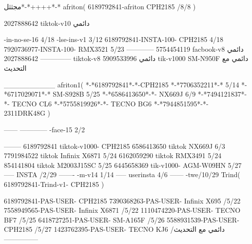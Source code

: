 مجثثل*-*++++*-*
afriton(
6189792841-afriton CPH2185  /8/8
)

2027888642 tiktok-v10
دائمي

-in-no-se-16 4/18
-lse-ins-v1 3/12
6189792841-INSTA-100- CPH2185 4/18
7920736977-INSTA-100- RMX3521 5/23
------------
5754454119 facbook-v8
دائمي
--------------
2027888642 tiktok-v8
دائمي
5909533996 tik-v1000  SM-N950F
دائمي مع التحديث

__________
afriton1(
*-*6189792841*-*-CPH2185
*-*7706352211*-* 5/14
*-*6717029071*-*  SM-S928B 5/25
*-*6586413650*-*- NX669J  6/9
*-*7494121837*-*-  TECNO CL6  \5
*-*5755819926*-*-   TECNO BG6  \5
*-*7944851595*-*-   2311DRK48G  \5\2
)


------
------------
-face-15 2/2

--------
6189792841 tiktok-v1000- CPH2185 
6586413650 tiktok NX669J  6/3
7791984522 tiktok Infinix X6871   5/24
6162059290 tiktok RMX3491   5/24
854141804 tiktok M2003J15SC   5/25
6445658369 tik-v1000- AGM-W09HN  5/27
-----
 INSTA /2/29
-------
-m-v14 1/14
-----
userinsta 4/6
------
-twe/10/29
Trind(
6189792841-Trind-v1- CPH2185 
)

6189792841-PAS-USER- CPH2185 
7390368263-PAS-USER-  Infinix X695  /5/22
7558949565-PAS-USER-  Infinix X6871  /5/22
1110474220-PAS-USER-  TECNO BF7  /5/25
6418727251-PAS-USER-  SM-A165F  /5/26
5588931539-PAS-USER-  CPH2185  /5/27
1423762395-PAS-USER- TECNO KJ6  /دائمي مع التحديث
    ---------------
